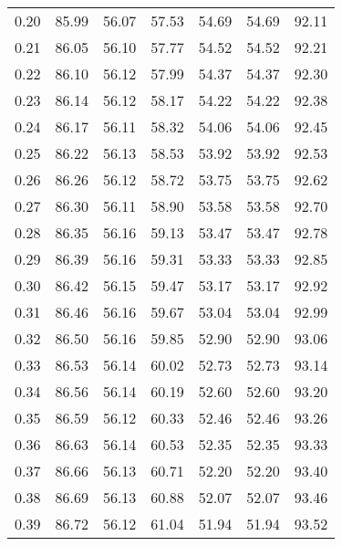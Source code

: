 \begin{tabular}{|c|c|c|c|c|c|c|}
      0.20 &     85.99 &     56.07 &      57.53 &   54.69 &      54.69 &         92.11 \\
      0.21 &     86.05 &     56.10 &      57.77 &   54.52 &      54.52 &         92.21 \\
      0.22 &     86.10 &     56.12 &      57.99 &   54.37 &      54.37 &         92.30 \\
      0.23 &     86.14 &     56.12 &      58.17 &   54.22 &      54.22 &         92.38 \\
      0.24 &     86.17 &     56.11 &      58.32 &   54.06 &      54.06 &         92.45 \\
      0.25 &     86.22 &     56.13 &      58.53 &   53.92 &      53.92 &         92.53 \\
      0.26 &     86.26 &     56.12 &      58.72 &   53.75 &      53.75 &         92.62 \\
      0.27 &     86.30 &     56.11 &      58.90 &   53.58 &      53.58 &         92.70 \\
      0.28 &     86.35 &     56.16 &      59.13 &   53.47 &      53.47 &         92.78 \\
      0.29 &     86.39 &     56.16 &      59.31 &   53.33 &      53.33 &         92.85 \\
      0.30 &     86.42 &     56.15 &      59.47 &   53.17 &      53.17 &         92.92 \\
      0.31 &     86.46 &     56.16 &      59.67 &   53.04 &      53.04 &         92.99 \\
      0.32 &     86.50 &     56.16 &      59.85 &   52.90 &      52.90 &         93.06 \\
      0.33 &     86.53 &     56.14 &      60.02 &   52.73 &      52.73 &         93.14 \\
      0.34 &     86.56 &     56.14 &      60.19 &   52.60 &      52.60 &         93.20 \\
      0.35 &     86.59 &     56.12 &      60.33 &   52.46 &      52.46 &         93.26 \\
      0.36 &     86.63 &     56.14 &      60.53 &   52.35 &      52.35 &         93.33 \\
      0.37 &     86.66 &     56.13 &      60.71 &   52.20 &      52.20 &         93.40 \\
      0.38 &     86.69 &     56.13 &      60.88 &   52.07 &      52.07 &         93.46 \\
      0.39 &     86.72 &     56.12 &      61.04 &   51.94 &      51.94 &         93.52 \\

\end{tabular}
